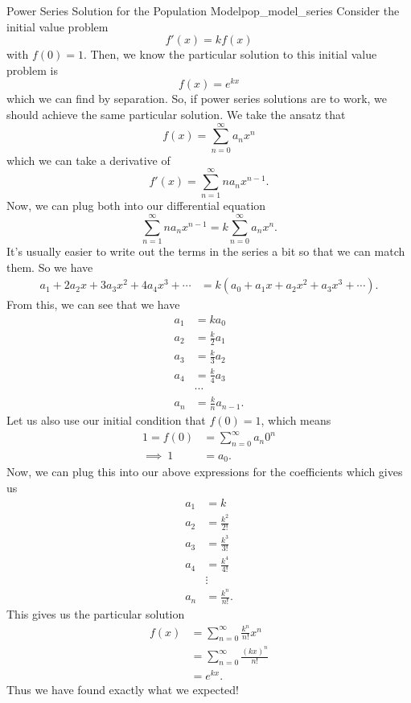 \begin{ex}{Power Series Solution for the Population Model}{pop_model_series}
Consider the initial value problem 
\[
f'(x)=kf(x)
\]
with $f(0)=1$.  Then, we know the particular solution to this initial value problem is
\[
f(x)=e^{kx}
\]
which we can find by separation.  So, if power series solutions are to work, we should achieve the same particular solution. We take the ansatz that
\[
f(x) = \sum_{n=0}^\infty a_n x^n
\]
which we can take a derivative of
\[
f'(x) = \sum_{n=1}^\infty na_n x^{n-1}.
\]
Now, we can plug both into our differential equation
\[
\sum_{n=1}^\infty na_n x^{n-1} = k \sum_{n=0}^\infty a_n x^n.
\]
It's usually easier to write out the terms in the series a bit so that we can match them.  So we have
\begin{align*}
    a_1 + 2a_2 x + 3 a_3 x^2 + 4 a_4 x^3 + \cdots &= k(a_0 + a_1 x + a_2 x^2 + a_3 x^3+ \cdots ).
\end{align*}
From this, we can see that we have
\begin{align*}
    a_1 &= k a_0\\
    a_2 &= \frac{k}{2} a_1\\
    a_3 &= \frac{k}{3} a_2 \\
    a_4 &= \frac{k}{4} a_3 \\
    &\cdots \\
    a_n &= \frac{k}{n} a_{n-1}.
\end{align*}
Let us also use our initial condition that $f(0)=1$, which means
\begin{align*}
    1=f(0)&=\sum_{n=0}^\infty a_n 0^n\\
    \implies~1&= a_0.
\end{align*}
Now, we can plug this into our above expressions for the coefficients which gives us
\begin{align*}
    a_1 &= k \\
    a_2 &= \frac{k^2}{2!} \\
    a_3 &= \frac{k^3}{3!}  \\
    a_4 &= \frac{k^4}{4!} \\
    &\vdots \\
    a_n &= \frac{k^n}{n!}.
\end{align*}
This gives us the particular solution
\begin{align*}
f(x) &= \sum_{n=0}^\infty \frac{k^n}{n!} x^n\\
&= \sum_{n=0}^\infty \frac{(kx)^n}{n!}\\
&= e^{kx}.
\end{align*}
Thus we have found exactly what we expected!
\end{ex}

